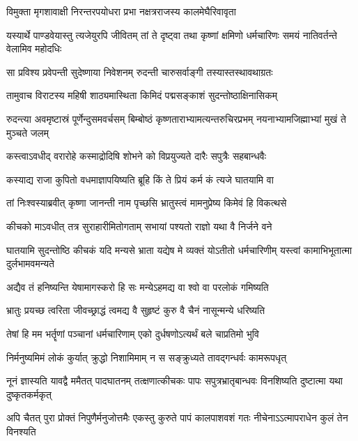 \twolineshloka
{विमुक्ता मृगशावाक्षी निरन्तरपयोधरा}
{प्रभा नक्षत्रराजस्य कालमेघैरिवावृता}


\threelineshloka
{यस्यार्थे पाण्डवेयास्तु त्यजेयुरपि जीवितम्}
{तां ते दृष्ट्वा तथा कृष्णां क्षमिणो धर्मचारिणः}
{समयं नातिवर्तन्ते वेलामिव महोदधिः}


\twolineshloka
{सा प्रविश्य प्रवेपन्ती सुदेष्णाया निवेशनम्}
{रुदन्ती चारुसर्वाङ्गी तस्यास्तस्थावथाग्रतः}


\twolineshloka
{तामुवाच विराटस्य महिषी शाठ्यमास्थिता}
{किमिदं पद्मसङ्काशं सुदन्तोष्ठाक्षिनासिकम्}


\threelineshloka
{रुदन्त्या अवमृष्टास्रं पूर्णेन्दुसमवर्चसम्}
{बिम्बोष्ठं कृष्णताराभ्यामत्यन्तरुचिरप्रभम्}
{नयनाभ्यामजिह्माभ्यां मुखं ते मुञ्चते जलम्}


\twolineshloka
{कस्त्वाऽवधीद् वरारोहे कस्माद्रोदिषि शोभने}
{को विप्रयुज्यते दारैः सपुत्रैः सहबान्धवैः}


\twolineshloka
{कस्याद्य राजा कुपितो वधमाज्ञापयिष्यति}
{ब्रूहि किं ते प्रियं कर्म कं त्यजे घातयामि वा}



\twolineshloka
{तां निःश्वस्याब्रवीत् कृष्णा जानन्ती नाम पृच्छसि}
{भ्रातुस्त्वं मामनुप्रेष्य किमेवं हि विकत्थसे}


\twolineshloka
{कीचको माऽवधीत् तत्र सुराहारीमितोगताम्}
{सभायां पश्यतो राज्ञो यथा वै निर्जने वने}




\threelineshloka
{घातयामि सुदन्तोष्ठि कीचकं यदि मन्यसे}
{भ्राता यद्येष मे व्यक्तं योऽतीतो धर्मचारिणीम्}
{यस्त्वां कामाभिभूतात्मा दुर्लभामवमन्यते}



\twolineshloka
{अद्यैव तं हनिष्यन्ति येषामागस्करो हि सः}
{मन्येऽहमद्य वा श्वो वा परलोकं गमिष्यति}


\twolineshloka
{भ्रातुः प्रयच्छ त्वरिता जीवच्छ्राद्धं त्वमद्य वै}
{सुहृष्टं कुरु वै चैनं नासून्मन्ये धरिष्यति}


\twolineshloka
{तेषां हि मम भर्तॄणां पञ्चानां धर्मचारिणाम्}
{एको दुर्धषणोऽत्यर्थं बले चाप्रतिमो भुवि}


\twolineshloka
{निर्मनुष्यमिमं लोकं कुर्यात् क्रुद्धो निशामिमाम्}
{न स सङ्क्रुध्यते तावद्गन्धर्वः कामरूपधृत्}


\threelineshloka
{नूनं ज्ञास्यति यावद्वै ममैतत् पादघातनम्}
{तत्क्षणात्कीचकः पापः सपुत्रभ्रातृबान्धवः}
{विनशिष्यति दुष्टात्मा यथा दुष्कृतकर्मकृत्}


\threelineshloka
{अपि चैतत् पुरा प्रोक्तं निपुणैर्मनुजोत्तमैः}
{एकस्तु कुरुते पापं कालपाशवशं गतः}
{नीचेनाऽऽत्मापराधेन कुलं तेन विनश्यति}


